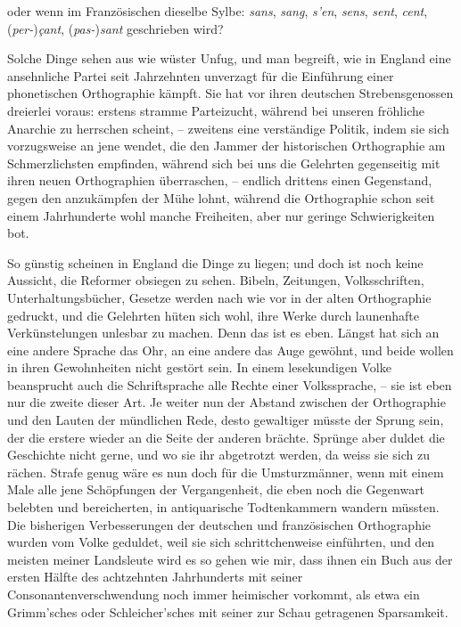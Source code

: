 \noindent oder wenn im Französischen dieselbe Sylbe: \textit{sans}, \textit{sang}, \textit{s’en}, \textit{sens}, \textit{sent}, \textit{cent}, \mbox{(\textit{per-})\textit{çant}}, \mbox{(\textit{pas-})\textit{sant}} geschrieben wird?

Solche Dinge sehen aus wie wüster Unfug, und man begreift, wie in England eine ansehnliche Partei seit Jahrzehnten unverzagt für die Einführung einer \label{sp.133} phonetischen Orthographie kämpft. Sie hat vor ihren deutschen Strebensgenossen dreierlei voraus: erstens stramme Parteizucht, während bei unseren  fröhliche Anarchie zu herrschen scheint, – zweitens eine verständige Politik, indem sie sich vorzugsweise an jene wendet, die den Jammer der historischen Orthographie am \label{fp.142} Schmerzlichsten empfinden, während sich bei uns die Gelehrten gegenseitig mit ihren neuen Orthographien überraschen, – endlich drittens einen Gegenstand, gegen den anzukämpfen der Mühe lohnt, während die  Orthographie schon seit einem Jahrhunderte wohl manche Freiheiten, aber nur geringe Schwierigkeiten bot.

So günstig scheinen in England die Dinge zu liegen; und doch ist noch keine Aussicht, die Reformer obsiegen zu sehen. Bibeln, Zeitungen, Volksschriften, Unterhaltungsbücher, Gesetze werden nach wie vor in der alten Orthographie gedruckt, und die Gelehrten hüten sich wohl, ihre Werke durch launenhafte Verkünstelungen unlesbar zu machen. Denn das ist es eben. Längst hat sich an eine andere Sprache das Ohr, an eine andere das Auge gewöhnt, und beide wollen in ihren Gewohnheiten nicht gestört sein. In einem lesekundigen Volke beansprucht auch die Schriftsprache alle Rechte einer Volkssprache, – sie ist eben nur die zweite dieser Art. Je weiter nun der Abstand zwischen der Orthographie und den Lauten der mündlichen Rede, desto gewaltiger müsste der Sprung sein, der die erstere wieder an die Seite der anderen brächte. Sprünge aber duldet die Geschichte nicht gerne, und wo sie ihr abgetrotzt werden, da weiss sie sich zu rächen. Strafe genug wäre es nun doch für die Umsturzmänner, wenn mit einem Male alle jene Schöpfungen der Vergangenheit, die eben noch die Gegenwart belebten und bereicherten, in antiquarische Todtenkammern wandern müssten. Die bisherigen Verbesserungen der deutschen und französischen Orthographie wurden vom Volke geduldet, weil sie sich schrittchenweise einführten, und den meisten meiner Landsleute wird es so gehen wie mir, dass ihnen ein  Buch aus der ersten Hälfte des achtzehnten Jahrhunderts mit seiner Consonantenverschwendung noch immer heimischer vorkommt, als etwa ein Grimm’sches oder Schleicher’sches mit seiner zur Schau getragenen Sparsamkeit.


